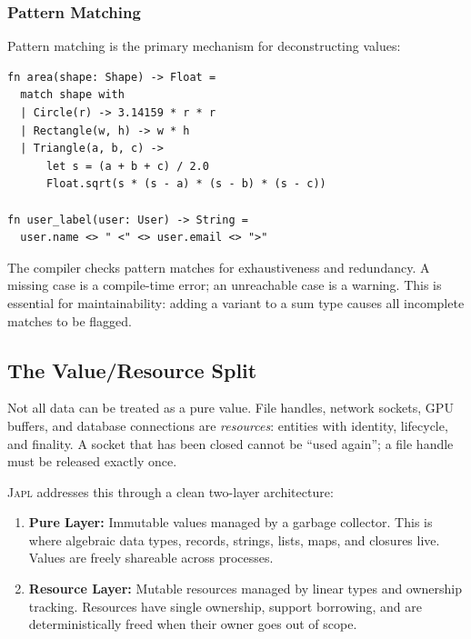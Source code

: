 \documentclass[11pt]{article}
\theoremstyle{definition}
\theoremstyle{remark}
\newcommand{\japl}{\textsc{Japl}}
\begin{document}
\subsubsection{Pattern Matching}

Pattern matching is the primary mechanism for deconstructing values:

\begin{lstlisting}[caption={Pattern matching in \japl{}.}]
fn area(shape: Shape) -> Float =
  match shape with
  | Circle(r) -> 3.14159 * r * r
  | Rectangle(w, h) -> w * h
  | Triangle(a, b, c) ->
      let s = (a + b + c) / 2.0
      Float.sqrt(s * (s - a) * (s - b) * (s - c))

fn user_label(user: User) -> String =
  user.name <> " <" <> user.email <> ">"
\end{lstlisting}

The compiler checks pattern matches for exhaustiveness and redundancy.
A missing case is a compile-time error; an unreachable case is a
warning.  This is essential for maintainability: adding a variant to
a sum type causes all incomplete matches to be flagged.

\subsection{The Value/Resource Split}
\label{sec:japl:split}

Not all data can be treated as a pure value.  File handles, network
sockets, GPU buffers, and database connections are \emph{resources}:
entities with identity, lifecycle, and finality.  A socket that has
been closed cannot be ``used again''; a file handle must be released
exactly once.

\japl{} addresses this through a clean two-layer architecture:

\begin{enumerate}
  \item \textbf{Pure Layer:} Immutable values managed by a garbage
    collector.  This is where algebraic data types, records, strings,
    lists, maps, and closures live.  Values are freely shareable
    across processes.

  \item \textbf{Resource Layer:} Mutable resources managed by linear
    types and ownership tracking.  Resources have single ownership,
    support borrowing, and are deterministically freed when their
    owner goes out of scope.
\end{enumerate}
\end{document}
